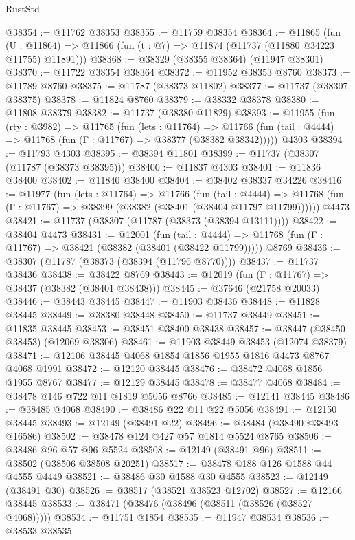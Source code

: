 \begin{lexlean}{RustStd}
\begin{coremodule}
@38354 := @11762 @38353
@38355 := @11759 @38354
@38364 := @11865
    (fun (U : @11864) => @11866 (fun (t : @7) => @11874 (@11737 (@11880 @34223 @11755) @11891)))
@38368 := @38329 (@38355 @38364) (@11947 @38301)
@38370 := @11722 @38354 @38364
@38372 := @11952 @38353 @8760
@38373 := @11789 @8760
@38375 := @11787 (@38373 @11802)
@38377 := @11737 (@38307 @38375)
@38378 := @11824 @8760
@38379 := @38332 @38378
@38380 := @11808 @38379
@38382 := @11737 (@38380 @11829)
@38393 := @11955
    (fun (rty : @3982) =>
    @11765
      (fun (lets : @11764) =>
      @11766 (fun (tail : @4444) => @11768 (fun (Γ : @11767) => @38377 (@38382 @38342)))))
    @4303
@38394 := @11793 @4303
@38395 := @38394 @11801
@38399 := @11737 (@38307 (@11787 (@38373 @38395)))
@38400 := @11837 @4303
@38401 := @11836 @38400
@38402 := @11840 @38400
@38404 := @38402 @38337 @34226
@38416 := @11977
    (fun (lets : @11764) =>
    @11766
      (fun (tail : @4444) =>
      @11768 (fun (Γ : @11767) => @38399 (@38382 (@38401 (@38404 @11797 @11799))))))
    @4473
@38421 := @11737 (@38307 (@11787 (@38373 (@38394 @13111))))
@38422 := @38404 @4473
@38431 := @12001
    (fun (tail : @4444) => @11768 (fun (Γ : @11767) => @38421 (@38382 (@38401 (@38422 @11799)))))
    @8769
@38436 := @38307 (@11787 (@38373 (@38394 (@11796 @8770))))
@38437 := @11737 @38436
@38438 := @38422 @8769
@38443 := @12019 (fun (Γ : @11767) => @38437 (@38382 (@38401 @38438)))
@38445 := @37646 (@21758 @20033)
@38446 := @38443 @38445
@38447 := @11903 @38436
@38448 := @11828 @38445
@38449 := @38380 @38448
@38450 := @11737 @38449
@38451 := @11835 @38445
@38453 := @38451 @38400 @38438
@38457 := @38447 (@38450 @38453) (@12069 @38306)
@38461 := @11903 @38449 @38453 (@12074 @38379)
@38471 := @12106 @38445 @4068 @1854 @1856 @1955 @1816 @4473 @8767 @4068 @1991
@38472 := @12120 @38445
@38476 := @38472 @4068 @1856 @1955 @8767
@38477 := @12129 @38445
@38478 := @38477 @4068
@38484 := @38478 @146 @722 @11 @1819 @5056 @8766
@38485 := @12141 @38445
@38486 := @38485 @4068
@38490 := @38486 @22 @11 @22 @5056
@38491 := @12150 @38445
@38493 := @12149 (@38491 @22)
@38496 := @38484 (@38490 @38493 @16586)
@38502 := @38478 @124 @427 @57 @1814 @5524 @8765
@38506 := @38486 @96 @57 @96 @5524
@38508 := @12149 (@38491 @96)
@38511 := @38502 (@38506 @38508 @20251)
@38517 := @38478 @188 @126 @1588 @44 @4555 @4449
@38521 := @38486 @30 @1588 @30 @4555
@38523 := @12149 (@38491 @30)
@38526 := @38517 (@38521 @38523 @12702)
@38527 := @12166 @38445
@38533 := @38471 (@38476 (@38496 (@38511 (@38526 (@38527 @4068)))))
@38534 := @11751 @1854
@38535 := @11947 @38534
@38536 := @38533 @38535

\end{coremodule}
\end{lexlean}
